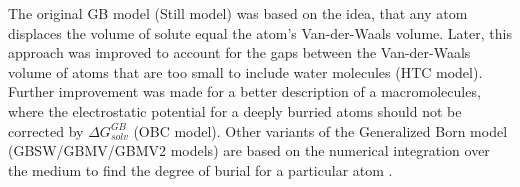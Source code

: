 \documentclass[11pt]{book}
\begin{document}
The original GB model (Still model) \cite{StillJACS90,DominyJPC99,QiuJPC97} was based on the idea, that any atom displaces the volume of solute equal the atom's Van-der-Waals volume. Later, this approach was improved to account for the gaps between the Van-der-Waals volume of atoms that are too small to include water molecules (HTC model)\cite{HawkinsJPC96}. Further improvement \cite{OnufrievJPC00} was made for a better description of a macromolecules, where the electrostatic potential for a deeply burried atoms should not be corrected by $\Delta G_{solv}^{GB}$ (OBC model). Other variants of the Generalized Born model (GBSW/GBMV/GBMV2 models) are based on the numerical integration over the medium to find the degree of burial for a particular atom \cite{ImJCC03,ImBPJ03,LeeJCP02,LeeJCC03}.

\end{document}
